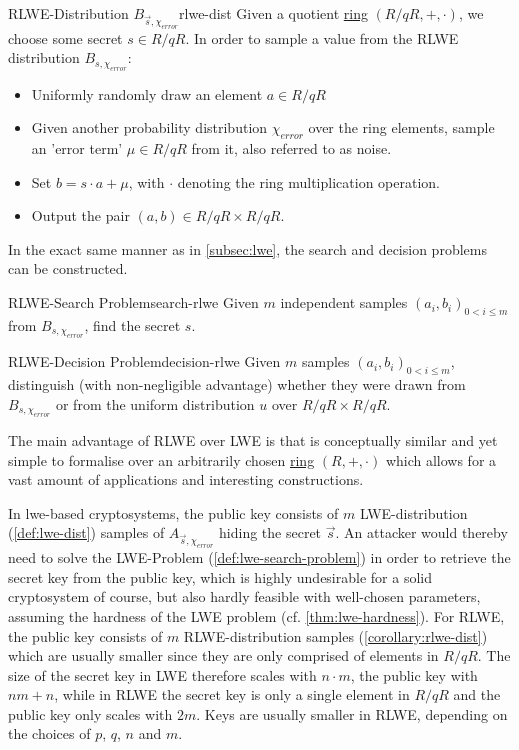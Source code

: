 \begin{corollary}{RLWE-Distribution $B_{\vec{s}, \chi_{error}}$}{rlwe-dist}
  Given a quotient \hyperref[def:ring]{ring} $(R/qR, +, \cdot)$, we choose some secret $s \in R/qR$.
  In order to sample a value from the RLWE distribution $B_{s, \chi_{error}}$:
  \begin{itemize}
    \item Uniformly randomly draw an element $a \in R/qR$
    \item Given another probability distribution $\chi_{error}$ over the ring elements,
          sample an 'error term' $\mu \in R/qR$ from it, also referred to as noise.
    \item Set $b = s \cdot a + \mu$, with $\cdot$ denoting the ring multiplication operation.
    \item Output the pair $(a, b) \in R/qR \times R/qR$.
  \end{itemize}
\end{corollary}

In the exact same manner as in \autoref{subsec:lwe}, the search and decision problems can be constructed.

\begin{corollary}{RLWE-Search Problem}{search-rlwe}
  Given $m$ independent samples $(a_i, b_i)_{0 < i \leq m}$ from $B_{s, \chi_{error}}$, find the secret $s$.
\end{corollary}
\begin{corollary}{RLWE-Decision Problem}{decision-rlwe}
  Given $m$ samples $(a_i, b_i)_{0 < i \leq m}$, distinguish (with non-negligible advantage)
  whether they were drawn from $B_{s, \chi_{error}}$ or from the uniform distribution
  $u$ over $R/qR \times R/qR$.
\end{corollary}

The main advantage of RLWE over LWE is that is conceptually similar and yet simple to formalise over an arbitrarily chosen \hyperref[def:ring]{ring} $(R, +, \cdot)$ which allows for a vast amount of applications and interesting constructions.

In \gls{lwe}-based cryptosystems, the public key consists of $m$ LWE-distribution (\autoref{def:lwe-dist}) samples of $A_{\vec{s},\chi_{error}}$ hiding the secret $\vec{s}$.
An attacker would thereby need to solve the LWE-Problem (\autoref{def:lwe-search-problem}) in order to retrieve the secret key from the public key, which is highly undesirable for a solid cryptosystem of course, but also hardly feasible with well-chosen parameters, assuming the hardness of the LWE problem (cf. \autoref{thm:lwe-hardness}).
For RLWE, the public key consists of $m$ RLWE-distribution samples (\autoref{corollary:rlwe-dist}) which are usually smaller since they are only comprised of elements in $R/qR$.
The size of the secret key in LWE therefore scales with $n \cdot m$, the public key with $nm + n$, while in RLWE the secret key is only a single element in $R/qR$ and the public key only scales with $2m$.
Keys are usually smaller in RLWE, depending on the choices of $p$, $q$, $n$ and $m$.

